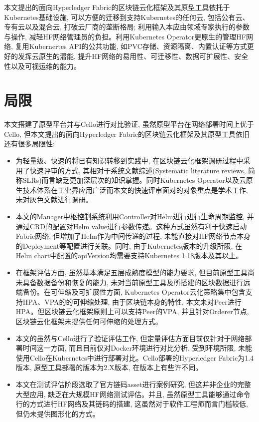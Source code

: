 本文提出的面向Hyperledger Fabric的区块链云化框架及其原型工具依托于Kubernetes基础设施, 可以方便的迁移到支持Kubernetes的任何云, 包括公有云、专有云以及混合云, 打破云厂商的垄断格局; 利用输入本应由领域专家执行的参数与操作, 减轻HF网络管理员的负担。利用Kubernetes Operator更原生的管理HF网络, 复用Kubernertes API的公共功能, 如PVC存储、资源隔离、内置认证等方式更好的发挥云原生的潜能, 提升HF网络的易用性、可迁移性、数据可扩展性、安全性以及可视运维的能力。

\section{局限}

本文搭建了原型平台并与Cello进行对比验证, 虽然原型平台在网络部署时间上优于Cello, 但本文提出的面向Hyperledger Fabric的区块链云化框架及其原型工具依旧还有很多局限性:

\begin{itemize}[itemindent=2em]
    \item 为轻量级、快速的将已有知识转移到实践中, 在区块链云化框架调研过程中采用了快速评审的方式, 其相对于系统文献综述(Systematic literature reviews, 简称SLRs)而言缺乏更加深层次的知识掌握。同时Kubernetes Operator以及云原生技术体系在工业界应用广泛而本文的快速评审面对的对象重点是学术工作, 未对灰色文献进行调研。

    \item 本文的Manager中枢控制系统利用Controller对Helm进行进行生命周期监控, 并通过CRD的配置对Helm value进行参数传递。这种方式虽然有利于快速启动Fabric网络, 但增加了Helm作为中间传递的过程, 未能直接对HF网络节点本身的Deployment等配置进行关联。同时, 由于Kubernetes版本的升级所限, 在Helm chart中配置的apiVersion均需要支持Kubernetes 1.18版本及其以上。

    \item 在框架评估方面, 虽然基本满足五层成熟度模型的能力要求, 但目前原型工具尚未具备数据备份和恢复的能力, 未对当前原型工具及所搭建的区块数据进行远端备份。在可伸缩及可扩展性方面, Kubernetes Operator云化策略集中包含支持HPA、VPA的的可伸缩处理, 由于区块链本身的特性, 本文未对Peer进行HPA。但区块链云化框架原则上可以支持Peer的VPA, 并且针对Orderer节点, 区块链云化框架未提供任何可伸缩的处理方式。

    \item 本文的虽然与Cello进行了验证评估工作, 但定量评估方面目前仅针对于网络部署时间这一方面, 而且目前仅对Docker环境进行对比分析, 受到环境所限, 未能使用Cello在Kubernetes中进行部署对比。Cello部署的Hyperledger Fabric为1.4版本, 原型工具部署的版本为2.X版本, 在版本上有些许不同。

    \item 本文在测试评估阶段选取了官方链码asset进行案例研究, 但这并非企业的完整大型应用, 缺乏在大规模HF网络测试评估。并且, 虽然原型工具能够通过命令行的方式进行HF网络及其链码的搭建, 这虽然对于软件工程师而言门槛较低, 但仍未提供图形化的方式。

\end{itemize}



